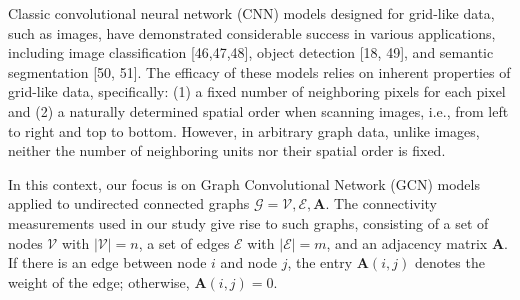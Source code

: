 \documentclass{cys}
\begin{document}







Classic convolutional neural network (CNN) models designed for grid-like data, such as images, have demonstrated considerable success in various applications, including image classification [46,47,48], object detection [18, 49], and semantic segmentation [50, 51]. The efficacy of these models relies on inherent properties of grid-like data, specifically: (1) a fixed number of neighboring pixels for each pixel and (2) a naturally determined spatial order when scanning images, i.e., from left to right and top to bottom. However, in arbitrary graph data, unlike images, neither the number of neighboring units nor their spatial order is fixed.

\bigskip
In this context, our focus is on Graph Convolutional Network (GCN) models applied to undirected connected graphs $\mathcal{G}={\mathcal{V},\mathcal{E},\mathbf{A}}$. The connectivity measurements used in our study give rise to such graphs, consisting of a set of nodes $\mathcal{V}$ with $|\mathcal{V}| = n$, a set of edges $\mathcal{E}$ with $|\mathcal{E}| = m$, and an adjacency matrix $\mathbf{A}$. If there is an edge between node $i$ and node $j$, the entry $\mathbf{A}(i,j)$ denotes the weight of the edge; otherwise, $\mathbf{A}(i,j) = 0$.
\end{document}
